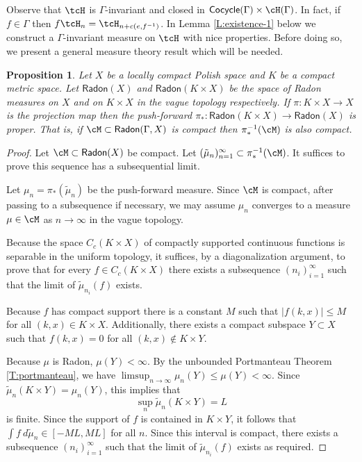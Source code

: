 \documentclass[12pt]{article}
\theoremstyle{plain}
\newtheorem{prop}[thm]{Proposition}
\theoremstyle{definition}
\theoremstyle{remark}
\newcommand{\G}{\Gamma}
\newcommand\Cocycle{\mathsf{Cocycle}}
\newcommand\Radon{\mathsf{Radon}}
\begin{document}
Observe that $\tcH$ is $\G$-invariant and closed in $\Cocycle(\G)\times \cH(\G)$. In fact, if $f\in\G$ then $f\tcH_n =\tcH_{n+c(e,f^{-1})}$. In Lemma \ref{L:existence-1} below we construct a $\G$-invariant measure on $\tcH$ with nice properties. Before doing so, we present a general measure theory result which will be needed.


\begin{prop}\label{P:general10}
Let $X$ be a locally compact Polish space and $K$ be a compact metric space. Let $\Radon(X)$ and $\Radon(K\times X)$ be the space of Radon measures on $X$ and on $K\times X$ in the vague topology respectively. If $\pi:K\times X \to X$ is the projection map then the push-forward $\pi_*:\Radon( K\times X)\to \Radon(X)$ is proper. That is, if $\cM \subset \Radon(\G,X)$ is compact then $\pi_*^{-1}(\cM)$ is also compact.
\end{prop}

\begin{proof}
Let $\cM \subset \Radon(X)$ be compact. Let $(\tilde{\mu}_n)_{n=1}^\infty \subset \pi_*^{-1}(\cM)$. It suffices to prove this sequence has a subsequential limit. 

Let $\mu_n=\pi_*(\tilde{\mu}_n)$ be the push-forward measure. Since $\cM$ is compact, after passing to a subsequence if necessary, we may assume $\mu_n$ converges to a measure $\mu \in \cM$  as $n\to\infty$ in the vague topology. 

Because the space $C_c(K\times X)$ of compactly supported continuous functions is separable in the uniform topology, it suffices, by a diagonalization argument, to prove that for every $f\in C_c(K \times X)$ there exists a subsequence $(n_i)_{i=1}^\infty$ such that the limit of $\tilde{\mu}_{n_i}(f)$ exists. 

Because $f$ has compact support there is a constant $M$ such that $|f(k,x)|\le M$ for all $(k,x)\in K\times X$. Additionally, there exists a compact subspace $Y \subset X$ such that $f(k,x)=0$ for all $(k,x) \notin K \times Y$. 

Because $\mu$ is Radon, $\mu(Y)<\infty$. By the unbounded Portmanteau Theorem \ref{T:portmanteau}, we have $\limsup_{n\to\infty} \mu_n(Y) \le \mu(Y)<\infty$. Since  $\tilde{\mu}_n(K\times Y) = \mu_n(Y)$, this implies that
$$\sup_{n}\tilde{\mu}_n(K\times Y)  =L$$
is finite. Since the support of $f$ is contained in $K\times Y$, it follows that $\int f~d\tilde{\mu}_n \in [-ML,ML]$ for all $n$.  Since this interval is compact, there exists a subsequence $(n_i)_{i=1}^\infty$ such that the limit of $\tilde{\mu}_{n_i}(f)$ exists as required.
\end{proof}
\end{document}
